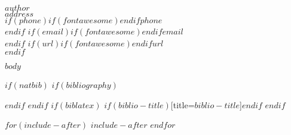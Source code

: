 \documentclass[
  $if(fontsize)$$fontsize$,$endif$
  $if(lang)$$babel-lang$,$endif$
  $if(papersize)$$papersize$paper,$endif$
  $for(classoption)$$classoption$$sep$,$endfor$
]{$documentclass$}
\author{$for(author)$$author$$sep$ \and $endfor$}
\date{$date$}
\begin{document}
\thispagestyle{firstpage}
\pagestyle{regular}
\maketitle

\begin{flushright}
{\large \sffamily \bfseries $author$}\\[.35ex]
\emph{\small $address$}\\[.35ex]
$if(phone)$$if(fontawesome)$\faPhone \hspace{1 mm}$endif$\small{$phone$}\\$endif$
$if(email)$$if(fontawesome)$\faEnvelopeO \hspace{1 mm}$endif$\small{\tt $email$}\\$endif$
$if(url)$$if(fontawesome)$\faGlobe \hspace{1 mm}$endif$\small{\href{http://$url$}{\tt $url$}}\\$endif$
\end{flushright}

$body$

$if(natbib)$
$if(bibliography)$
  
$endif$
$endif$
$if(biblatex)$
  \printbibliography$if(biblio-title)$[title=$biblio-title$]$endif$
$endif$

$for(include-after)$
$include-after$
$endfor$
\end{document}
